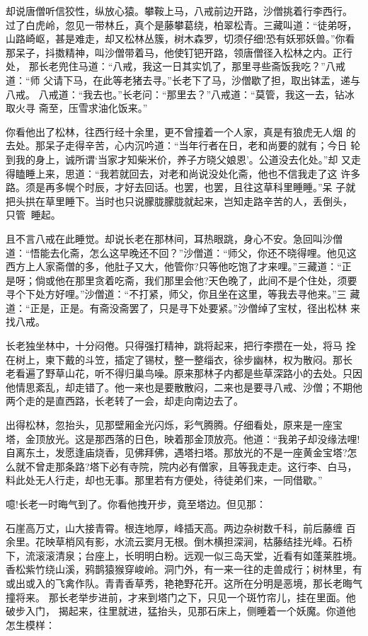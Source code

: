 却说唐僧听信狡性，纵放心猿。攀鞍上马，八戒前边开路，沙僧挑着行李西行。
过了白虎岭，忽见一带林丘，真个是藤攀葛绕，柏翠松青。三藏叫道：“徒弟呀，
山路崎岖，甚是难走，却又松林丛簇，树木森罗，切须仔细!恐有妖邪妖兽。”你看
那呆子，抖擞精神，叫沙僧带着马，他使钉钯开路，领唐僧径入松林之内。正行处，
那长老兜住马道：“八戒，我这一日其实饥了，那里寻些斋饭我吃？”八戒道：“师
父请下马，在此等老猪去寻。”长老下了马，沙僧歇了担，取出钵盂，递与八戒。
八戒道：“我去也。”长老问：“那里去？”八戒道：“莫管，我这一去，钻冰取火寻
斋至，压雪求油化饭来。”

你看他出了松林，往西行经十余里，更不曾撞着一个人家，真是有狼虎无人烟
的去处。那呆子走得辛苦，心内沉吟道：“当年行者在日，老和尚要的就有；今日
轮到我的身上，诚所谓‘当家才知柴米价，养子方晓父娘恩’。公道没去化处。”却
又走得瞌睡上来，思道：“我若就回去，对老和尚说没处化斋，他也不信我走了这
许多路。须是再多幌个时辰，才好去回话。也罢，也罢，且往这草科里睡睡。”呆
子就把头拱在草里睡下。当时也只说朦胧朦胧就起来，岂知走路辛苦的人，丢倒头，
只管睡起。

且不言八戒在此睡觉。却说长老在那林间，耳热眼跳，身心不安。急回叫沙僧
道：“悟能去化斋，怎么这早晚还不回？”沙僧道：“师父，你还不晓得哩。他见这
西方上人家斋僧的多，他肚子又大，他管你?只等他吃饱了才来哩。”三藏道：“正
是呀；倘或他在那里贪着吃斋，我们那里会他?天色晚了，此间不是个住处，须要
寻个下处方好哩。”沙僧道：“不打紧，师父，你且坐在这里，等我去寻他来。”三
藏道：“正是，正是。有斋没斋罢了，只是寻下处要紧。”沙僧绰了宝杖，径出松林
来找八戒。

长老独坐林中，十分闷倦。只得强打精神，跳将起来，把行李攒在一处，将马
拴在树上，柬下戴的斗笠，插定了锡杖，整一整缁衣，徐步幽林，权为散闷。那长
老看遍了野草山花，听不得归巢鸟噪。原来那林子内都是些草深路小的去处。只因
他情思紊乱，却走错了。他一来也是要散散闷，二来也是要寻八戒、沙僧；不期他
两个走的是直西路，长老转了一会，却走向南边去了。

出得松林，忽抬头，见那壁厢金光闪烁，彩气腾腾。仔细看处，原来是一座宝
塔，金顶放光。这是那西落的日色，映着那金顶放亮。他道：“我弟子却没缘法哩!
自离东土，发愿逢庙烧香，见佛拜佛，遇塔扫塔。那放光的不是一座黄金宝塔?怎
么就不曾走那条路?塔下必有寺院，院内必有僧家，且等我走走。这行李、白马，
料此处无人行走，却也无事。那里若有方便处，待徒弟们来，一同借歇。”

噫!长老一时晦气到了。你看他拽开步，竟至塔边。但见那：

石崖高万丈，山大接青霄。根连地厚，峰插天高。两边杂树数千科，前后藤缠
百余里。花映草梢风有影，水流云窦月无根。倒木横担深涧，枯藤结挂光峰。石桥
下，流滚滚清泉；台座上，长明明白粉。远观一似三岛天堂，近看有如蓬莱胜境。
香松紫竹绕山溪，鸦鹊猿猴穿峻岭。洞门外，有一来一往的走兽成行；树林里，有
或出或入的飞禽作队。青青香草秀，艳艳野花开。这所在分明是恶境，那长老晦气
撞将来。
那长老举步进前，才来到塔门之下，只见一个斑竹帘儿，挂在里面。他破步入门，
揭起来，往里就进，猛抬头，见那石床上，侧睡着一个妖魔。你道他怎生模样：

